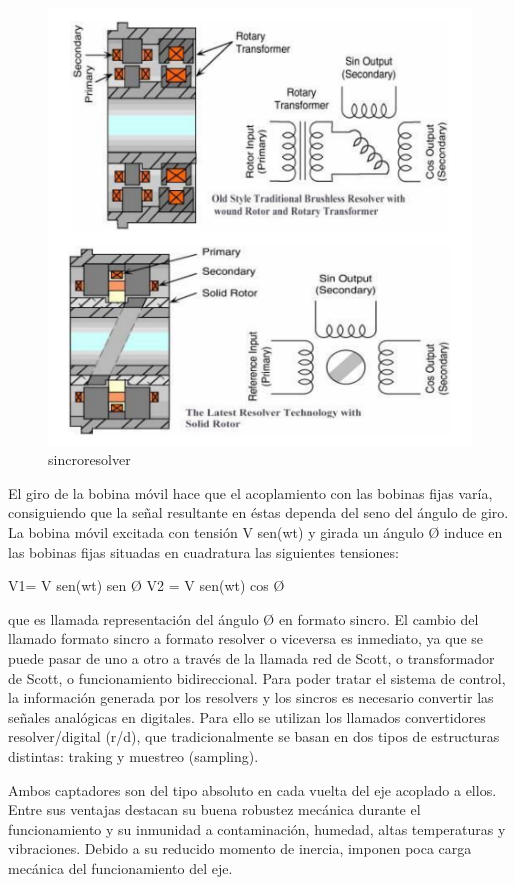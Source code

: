 \begin{figure}[h]
	\centering
	\includegraphics[width=0.7\linewidth]{img/sincroresolvers 1.png}
	\caption{sincroresolver}
	\label{fig:insertarimagen}
\end{figure}



El giro de la bobina móvil hace que el acoplamiento con las bobinas fijas varía, consiguiendo que la señal resultante en éstas dependa del seno del ángulo de giro. La bobina móvil excitada con tensión V sen(wt) y girada un ángulo Ø induce en las bobinas fijas situadas en cuadratura las siguientes tensiones:

 V1= V sen(wt) sen Ø
 V2 = V sen(wt) cos Ø 
 
que es llamada representación del ángulo Ø en formato sincro. El cambio del llamado formato sincro a formato resolver o viceversa es inmediato, ya que se puede pasar de uno a otro a través de la llamada red de Scott, o transformador de Scott, o funcionamiento bidireccional. Para poder tratar el sistema de control, la información generada por los resolvers y los sincros es necesario convertir las señales analógicas en digitales. Para ello se utilizan los llamados convertidores resolver/digital (r/d), que tradicionalmente se basan en dos tipos de estructuras distintas: traking y muestreo (sampling).


Ambos captadores son del tipo absoluto en cada vuelta del eje acoplado a ellos. Entre sus ventajas destacan su buena robustez mecánica durante el funcionamiento y su inmunidad a contaminación, humedad, altas temperaturas y vibraciones. Debido a su reducido momento de inercia, imponen poca carga mecánica del funcionamiento del eje.

